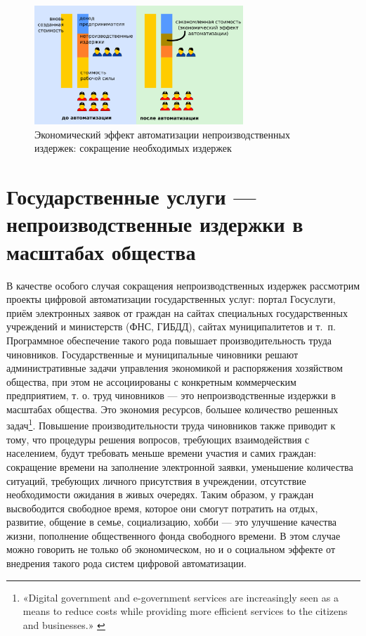 \documentclass{article}
\begin{document}
\begin{figure}[h]
    \centering
    \includegraphics[width=0.70\textwidth]{effect-nonproduction}
    \caption{Экономический эффект автоматизации непроизводственных издержек: сокращение необходимых издержек}
    \label{fig:effect_nonproduction}
\end{figure}

\section*{Государственные услуги — непроизводственные издержки в масштабах общества}

В качестве особого случая сокращения непроизводственных издержек рассмотрим проекты цифровой автоматизации государственных услуг: портал Госуслуги, приём электронных заявок от граждан на сайтах специальных государственных учреждений и министерств (ФНС, ГИБДД), сайтах муниципалитетов и т. п. Программное обеспечение такого рода повышает производительность труда чиновников. Государственные и муниципальные чиновники решают административные задачи управления экономикой и распоряжения хозяйством общества, при этом не ассоциированы с конкретным коммерческим предприятием, т. о. труд чиновников — это непроизводственные издержки в масштабах общества. Это экономия ресурсов, большее количество решенных задач\footnote{«Digital government and e-government services are increasingly seen as a means to reduce costs while providing more efficient services to the citizens and businesses.» \cite{economicDigitalization2019}}. Повышение производительности труда чиновников также приводит к тому, что процедуры решения вопросов, требующих взаимодействия с населением, будут требовать меньше времени участия и самих граждан: сокращение времени на заполнение электронной заявки, уменьшение количества ситуаций, требующих личного присутствия в учреждении, отсутствие необходимости ожидания в живых очередях. Таким образом, у граждан высвободится свободное время, которое они смогут потратить на отдых, развитие, общение в семье, социализацию, хобби — это улучшение качества жизни, пополнение общественного фонда свободного времени. В этом случае можно говорить не только об экономическом, но и о социальном эффекте от внедрения такого рода систем цифровой автоматизации.
\end{document}
